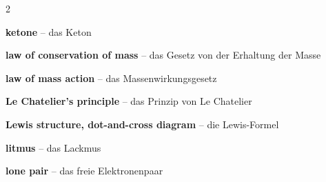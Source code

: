 \begin{multicols}{2}
\par\nopagebreak
\textbf{ketone} -- das Keton\dotfill\hyperref[e:222]{\pageref*{e:222}}\par

\par\nopagebreak
\textbf{law of conservation of mass} -- das Gesetz von der Erhaltung der Masse\dotfill\hyperref[e:149]{\pageref*{e:149}}\par
\textbf{law of mass action} -- das Massenwirkungsgesetz\dotfill\hyperref[e:147]{\pageref*{e:147}}\par
\textbf{Le Chatelier's principle} -- das Prinzip von Le Chatelier\dotfill\hyperref[e:148]{\pageref*{e:148}}\par
\textbf{Lewis structure, dot-and-cross diagram} -- die Lewis-Formel\dotfill\hyperref[e:123]{\pageref*{e:123}}\par
\textbf{litmus} -- das Lackmus\dotfill\hyperref[e:160]{\pageref*{e:160}}\par
\textbf{lone pair} -- das freie Elektronenpaar\dotfill\hyperref[e:111]{\pageref*{e:111}}\par


\end{multicols}
